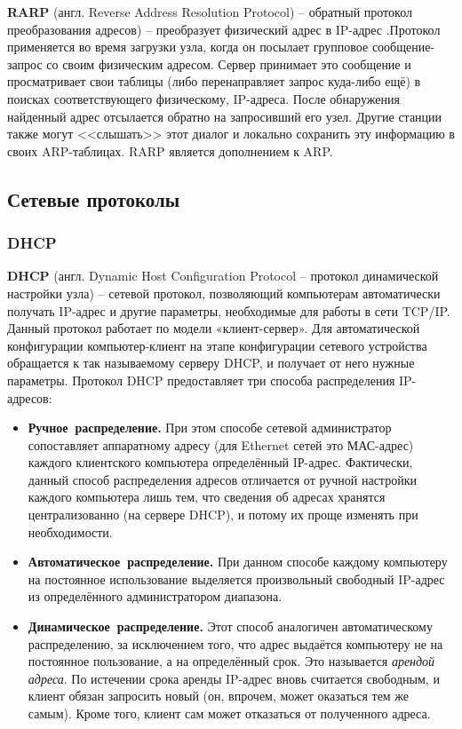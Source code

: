 \documentclass[a4paper]{article}
\begin{document}
		\textbf{RARP} (англ. Reverse Address Resolution Protocol) -- обратный протокол преобразования адресов) -- преобразует физический адрес в IP-адрес .Протокол применяется во время загрузки узла, когда он посылает групповое сообщение-запрос со своим физическим адресом. Сервер принимает это сообщение и просматривает свои таблицы (либо перенаправляет запрос куда-либо ещё) в поисках соответствующего физическому, IP-адреса. После обнаружения найденный адрес отсылается обратно на запросивший его узел. Другие станции также могут <<слышать>> этот диалог и локально сохранить эту информацию в своих ARP-таблицах. RARP является дополнением к ARP.
		
	\subsection{Сетевые протоколы}
		\subsubsection{DHCP}
			\textbf{DHCP} (англ. Dynamic Host Configuration Protocol -- протокол динамической настройки узла) -- сетевой протокол, позволяющий компьютерам автоматически получать IP-адрес и другие параметры, необходимые для работы в сети TCP/IP. Данный протокол работает по модели «клиент-сервер». Для автоматической конфигурации компьютер-клиент на этапе конфигурации сетевого устройства обращается к так называемому серверу DHCP, и получает от него нужные параметры. Протокол DHCP предоставляет три способа распределения IP-адресов:
			\begin{itemize}
				\item 
					\textbf{Ручное распределение.} При этом способе сетевой администратор сопоставляет аппаратному адресу (для Ethernet сетей это МАС-адрес) каждого клиентского компьютера определённый IР-адрес. Фактически, данный способ распределения адресов отличается от ручной настройки каждого компьютера лишь тем, что сведения об адресах хранятся централизованно (на сервере DHCP), и потому их проще изменять при необходимости.
				\item 
					\textbf{Автоматическое распределение.} При данном способе каждому компьютеру на постоянное использование выделяется произвольный свободный IP-адрес из определённого администратором диапазона.
				\item 
					\textbf{Динамическое распределение.} Этот способ аналогичен автоматическому распределению, за исключением того, что адрес выдаётся компьютеру не на постоянное пользование, а на определённый срок. Это называется \emph{арендой адреса}. По истечении срока аренды IP-адрес вновь считается свободным, и клиент обязан запросить новый (он, впрочем, может оказаться тем же самым). Кроме того, клиент сам может отказаться от полученного адреса. 
			\end{itemize}
\end{document}
